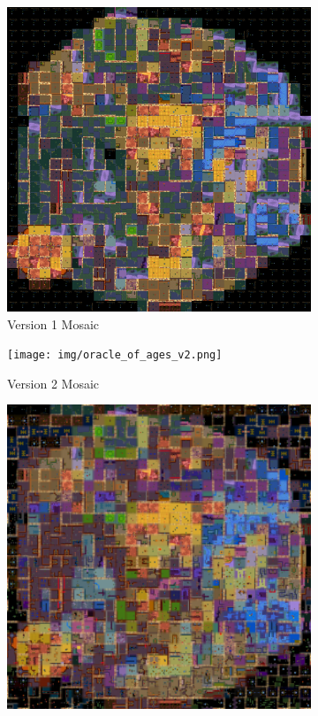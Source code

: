 \documentclass[11pt,conference]{IEEEtran}
\theoremstyle{plain} %
\theoremstyle{definition}
\theoremstyle{remark}
\begin{document}
\begin{figure}[pht]
\begin{subfigure}{0.35\textwidth}
        \includegraphics[width=\linewidth]{img/oracle_of_ages_v1.png}
        \caption{Version 1 Mosaic}
    \end{subfigure}
    \begin{subfigure}{0.35\textwidth}
        \texttt{[image: img/oracle\_of\_ages\_v2.png]}
        \caption{Version 2 Mosaic}
    \end{subfigure}
    \begin{subfigure}{0.35\textwidth}
        \includegraphics[width=\linewidth]{img/oracle_of_ages_v3.png}

\end{subfigure}
\end{figure}
\end{document}
